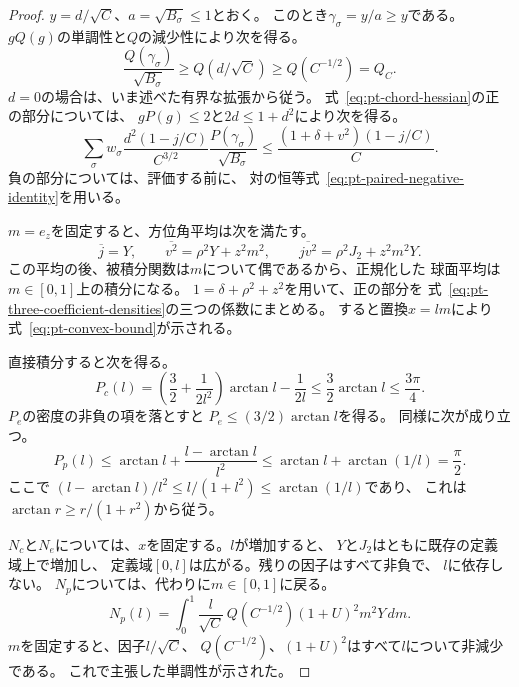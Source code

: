 \begin{proof}
$y=d/\sqrt C$、$a=\sqrt{B_\sigma}\leq1$とおく。
このとき$\gamma_\sigma=y/a\geq y$である。
$gQ(g)$の単調性と$Q$の減少性により次を得る。
\[
 \frac{Q(\gamma_\sigma)}{\sqrt{B_\sigma}}
 \geq Q(d/\sqrt C)\geq Q(C^{-1/2})=Q_C.
\]
$d=0$の場合は、いま述べた有界な拡張から従う。
式~\eqref{eq:pt-chord-hessian}の正の部分については、
$gP(g)\leq2$と$2d\leq1+d^2$により次を得る。
\[
 \sum_\sigma w_\sigma
 \frac{d^2(1-j/C)}{C^{3/2}}
 \frac{P(\gamma_\sigma)}{\sqrt{B_\sigma}}
 \leq \frac{(1+\delta+v^2)(1-j/C)}{C}.
\]
負の部分については、評価する前に、
対の恒等式~\eqref{eq:pt-paired-negative-identity}を用いる。

$m=e_z$を固定すると、方位角平均は次を満たす。
\[
 \overline j=Y,\qquad
 \overline{v^2}=\rho^2Y+z^2m^2,\qquad
 \overline{jv^2}=\rho^2J_2+z^2m^2Y.
\]
この平均の後、被積分関数は$m$について偶であるから、正規化した
球面平均は$m\in[0,1]$上の積分になる。
$1=\delta+\rho^2+z^2$を用いて、正の部分を
式~\eqref{eq:pt-three-coefficient-densities}の三つの係数にまとめる。
すると置換$x=lm$により式~\eqref{eq:pt-convex-bound}が示される。

直接積分すると次を得る。
\[
 P_c(l)=\left(\frac32+\frac{1}{2l^2}\right)\arctan l
 -\frac{1}{2l}\leq\frac32\arctan l\leq\frac{3\pi}{4}.
\]
$P_e$の密度の非負の項を落とすと
$P_e\leq(3/2)\arctan l$を得る。
同様に次が成り立つ。
\[
 P_p(l)\leq\arctan l+\frac{l-\arctan l}{l^2}
 \leq\arctan l+\arctan(1/l)=\frac{\pi}{2}.
\]
ここで
$(l-\arctan l)/l^2\leq l/(1+l^2)\leq\arctan(1/l)$であり、
これは$\arctan r\geq r/(1+r^2)$から従う。

$N_c$と$N_e$については、$x$を固定する。$l$が増加すると、
$Y$と$J_2$はともに既存の定義域上で増加し、
定義域$[0,l]$は広がる。残りの因子はすべて非負で、
$l$に依存しない。
$N_p$については、代わりに$m\in[0,1]$に戻る。
\[
 N_p(l)=\int_0^1
 \frac{l}{\sqrt C}\,Q(C^{-1/2})(1+U)^2m^2Y\,dm .
\]
$m$を固定すると、因子$l/\sqrt C$、
$Q(C^{-1/2})$、$(1+U)^2$はすべて$l$について非減少である。
これで主張した単調性が示された。
\end{proof}

